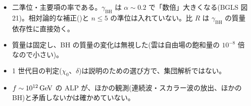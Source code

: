 \begin{caveat}
\begin{itemize}
\item 二準位・主要項の率である。$\gamma_\mathrm{BH}$ は $\alpha\sim0.2$ で「数倍」大きくなる(BGLS 図 21)。相対論的な補正()と $n\le5$ の準位は入れていない。比 $R$ は $\gamma_\mathrm{BH}$ の質量依存性に直接効く。
\item 質量は固定し、BH の質量の変化は無視した(雲は自由場の飽和量の $10^{-8}$ 倍なので小さい)。
\item 1 世代目の判定($\chi_0$、$\delta$)は説明のための選び方で、集団解析ではない。
\item $f\sim10^{12}\,\mathrm{GeV}$ の ALP が、ほかの観測(連続波・スカラー波の放出、ほかの BH)と矛盾しないかは確かめていない。
\end{itemize}
\end{caveat}
